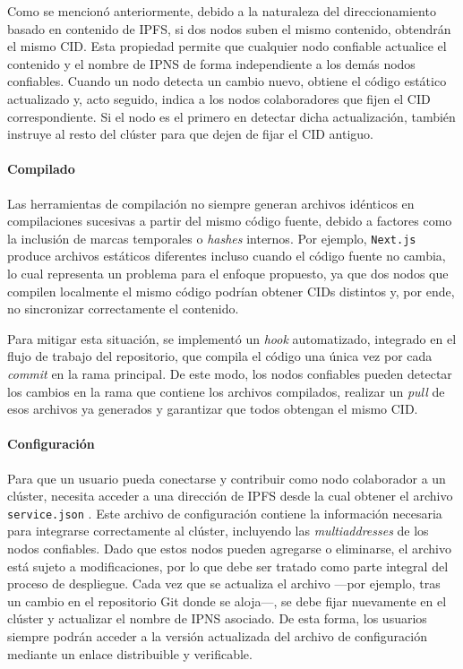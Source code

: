 Como se mencionó anteriormente, debido a la naturaleza del direccionamiento basado en contenido de IPFS, si dos nodos suben el mismo contenido, obtendrán el mismo CID. Esta propiedad permite que cualquier nodo confiable actualice el contenido y el nombre de IPNS de forma independiente a los demás nodos confiables. Cuando un nodo detecta un cambio nuevo, obtiene el código estático actualizado y, acto seguido, indica a los nodos colaboradores que fijen el CID correspondiente. Si el nodo es el primero en detectar dicha actualización, también instruye al resto del clúster para que dejen de fijar el CID antiguo.

\paragraph{Compilado} Las herramientas de compilación no siempre generan archivos idénticos en compilaciones sucesivas a partir del mismo código fuente, debido a factores como la inclusión de marcas temporales o \textit{hashes} internos. Por ejemplo, \texttt{Next.js} produce archivos estáticos diferentes incluso cuando el código fuente no cambia, lo cual representa un problema para el enfoque propuesto, ya que dos nodos que compilen localmente el mismo código podrían obtener CIDs distintos y, por ende, no sincronizar correctamente el contenido.

Para mitigar esta situación, se implementó un \textit{hook} automatizado, integrado en el flujo de trabajo del repositorio, que compila el código una única vez por cada \textit{commit} en la rama principal. De este modo, los nodos confiables pueden detectar los cambios en la rama que contiene los archivos compilados, realizar un \textit{pull} de esos archivos ya generados y garantizar que todos obtengan el mismo CID.

\paragraph{Configuración} Para que un usuario pueda conectarse y contribuir como nodo colaborador a un clúster, necesita acceder a una dirección de IPFS desde la cual obtener el archivo \texttt{service.json} \cite{service-json}. Este archivo de configuración contiene la información necesaria para integrarse correctamente al clúster, incluyendo las \textit{multiaddresses} \cite{multiaddr} de los nodos confiables.
Dado que estos nodos pueden agregarse o eliminarse, el archivo está sujeto a modificaciones, por lo que debe ser tratado como parte integral del proceso de despliegue. Cada vez que se actualiza el archivo —por ejemplo, tras un cambio en el repositorio Git donde se aloja—, se debe fijar nuevamente en el clúster y actualizar el nombre de IPNS asociado. De esta forma, los usuarios siempre podrán acceder a la versión actualizada del archivo de configuración mediante un enlace distribuible y verificable.

